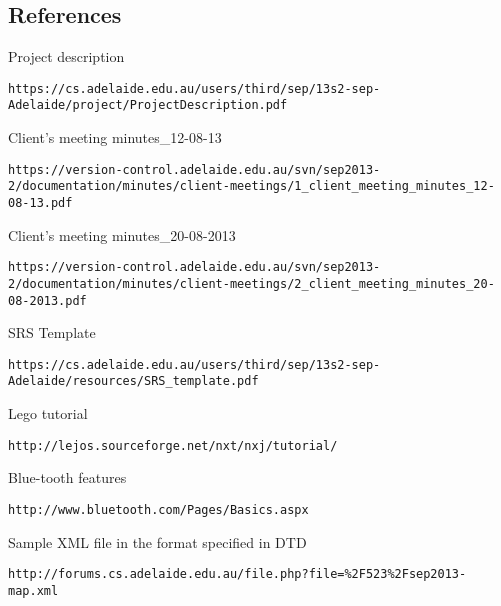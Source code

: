 \documentclass[titlepage]{article}
\begin{document}
\subsection{References}


\begin{thebibliography}{9}

 Project description\\
\label{Project description}
\begin{verbatim}
https://cs.adelaide.edu.au/users/third/sep/13s2-sep-Adelaide/project/ProjectDescription.pdf
\end{verbatim}

 Client's meeting minutes\_12-08-13\\
\label{1_ Client's meeting}
\begin{verbatim}
https://version-control.adelaide.edu.au/svn/sep2013-2/documentation/minutes/client-meetings/1_client_meeting_minutes_12-08-13.pdf
\end{verbatim}

 Client's meeting minutes\_20-08-2013\\
\label{2_ Client's meeting}
\begin{verbatim}
https://version-control.adelaide.edu.au/svn/sep2013-2/documentation/minutes/client-meetings/2_client_meeting_minutes_20-08-2013.pdf
\end{verbatim}


 SRS Template\\
\label{SRS Template}
\begin{verbatim}
https://cs.adelaide.edu.au/users/third/sep/13s2-sep-Adelaide/resources/SRS_template.pdf
\end{verbatim}


 Lego tutorial\\
\label{Lego tutorial}
\begin{verbatim}
http://lejos.sourceforge.net/nxt/nxj/tutorial/
\end{verbatim}


 Blue-tooth features\\
\label{Blue-tooth features}
\begin{verbatim}
http://www.bluetooth.com/Pages/Basics.aspx
\end{verbatim}



 Sample XML file in the format specified in DTD\\
\label{XML}
\begin{verbatim}
http://forums.cs.adelaide.edu.au/file.php?file=%2F523%2Fsep2013-map.xml
\end{verbatim}




\end{thebibliography}
\newpage
\end{document}
